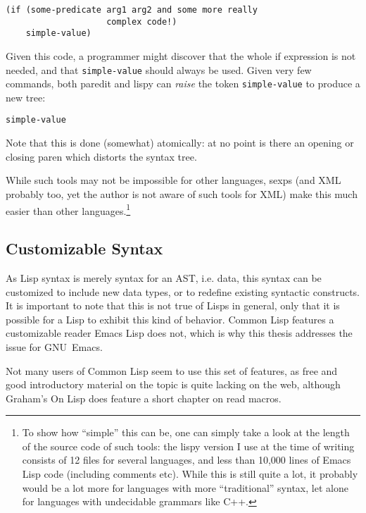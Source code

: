 \documentclass[a4paper,10pt,twoside]{article}
\newcommand{\el}{Emacs Lisp}
\newcommand{\cl}{Common Lisp}
\newcommand{\sym}[1]{\texttt{#1}}
\newcommand{\emacs}{GNU~Emacs}
\begin{document}
\begin{lstlisting}[style=lispinline]
(if (some-predicate arg1 arg2 and some more really
                    complex code!)
    simple-value)
\end{lstlisting}

Given this code, a programmer might discover that the whole if expression is not
needed, and that \sym{simple-value} should always be used.  Given very few
commands, both paredit and lispy can \emph{raise} the token \sym{simple-value}
to produce a new tree:

\begin{lstlisting}[style=lispinline]
simple-value
\end{lstlisting}

Note that this is done (somewhat) atomically: at no point is there an opening or
closing paren which distorts the syntax tree.

While such tools may not be impossible for other languages, sexps (and XML
probably too, yet the author is not aware of such tools for XML) make this much
easier than other languages.\footnote{To show how ``simple'' this can be, one
  can simply take a look at the length of the source code of such tools: the
  lispy version I use at the time of writing consists of 12 files for several
  languages, and less than 10,000 lines of \el{} code (including comments etc).
  While this is still quite a lot, it probably would be a lot more for languages
  with more ``traditional'' syntax, let alone for languages with undecidable
  grammars like C++.}

\subsection{Customizable Syntax}
\label{subsec:custom-syntax}

As Lisp syntax is merely syntax for an AST, i.e. data, this syntax can be
customized to include new data types, or to redefine existing syntactic
constructs.  It is important to note that this is not true of Lisps in general,
only that it is possible for a Lisp to exhibit this kind of behavior.  \cl{}
features a customizable reader \el{} does not, which is why this thesis
addresses the issue for \emacs{}.

Not many users of \cl{} seem to use this set of features, as free and good
introductory material on the topic is quite lacking on the web, although
Graham’s On Lisp \cite{on-lisp} does feature a short chapter on read
macros.
\end{document}
